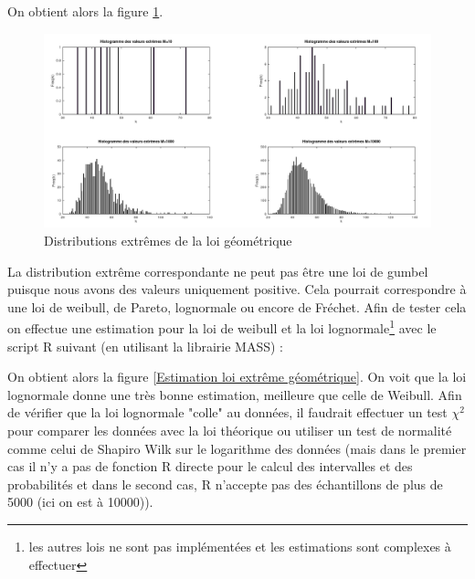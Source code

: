 \documentclass[12pt,a4paper,titlepage]{article}
\numberwithin{equation}{section}
\begin{document}


On obtient alors la figure \ref{Distributions extrêmes de la loi géométrique}.

\begin{figure}[!h]
\begin{center}
 \includegraphics[scale=0.4]{images/extremGeom.png} 
\end{center}
 \caption{Distributions extrêmes de la loi géométrique}
 \label{Distributions extrêmes de la loi géométrique}
\end{figure}

La distribution extrême correspondante ne peut pas être une loi de gumbel puisque nous avons des valeurs uniquement positive. Cela pourrait correspondre à une loi de weibull, de Pareto, lognormale ou encore de Fréchet.
Afin de tester cela on effectue une estimation pour la loi de weibull et la loi lognormale\footnote{les autres lois ne sont pas implémentées et les estimations sont complexes à effectuer} avec le script R suivant (en utilisant la librairie MASS) :



On obtient alors la figure \ref{Estimation loi extrême géométrique}. On voit que la loi lognormale donne une très bonne estimation, meilleure que celle de Weibull. Afin de vérifier que la loi lognormale "colle" au données, il faudrait effectuer un test $\chi^2$ pour comparer les données avec la loi théorique ou utiliser un test de normalité comme celui de Shapiro Wilk sur le logarithme des données (mais dans le premier cas il n'y a pas de fonction R directe pour le calcul des intervalles et des probabilités et dans le second cas, R n'accepte pas des échantillons de plus de 5000 (ici on est à 10000)).
\end{document}
